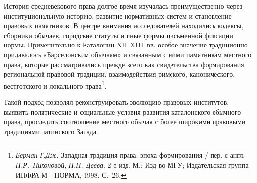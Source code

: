 
История средневекового права долгое время изучалась преимущественно через институциональную историю, развитие нормативных систем и становление правовых памятников. В центре внимания исследователей находились кодексы, сборники обычаев, городские статуты и иные формы письменной фиксации нормы. Применительно к Каталонии XII--XIII~вв. особое значение традиционно придавалось «Барселонским обычаям» и связанным с ними памятникам местного права, которые рассматривались прежде всего как свидетельства формирования региональной правовой традиции, взаимодействия римского, канонического, вестготского и локального права\footnote{\emph{Берман }\emph{Г.Дж}\emph{. }Западная традиция права: эпоха формирования / пер. с англ. \emph{Н.Р.~Никоновой}, \emph{Н.Н.~Деева}. 2-е изд. М.: Изд-во МГУ; Издательская группа ИНФРА-М---НОРМА, 1998. С.~26.}.

Такой подход позволял реконструировать эволюцию правовых институтов, выявить политические и социальные условия развития каталонского обычного права, проследить соотношение местного обычая с более широкими правовыми традициями латинского Запада.

